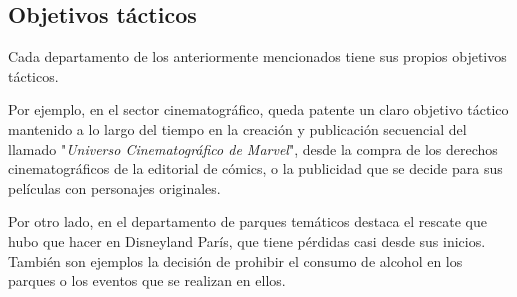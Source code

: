 \subsection{Objetivos tácticos}
Cada departamento de los anteriormente mencionados tiene sus propios objetivos tácticos.

Por ejemplo, en el sector cinematográfico, queda patente un claro objetivo táctico mantenido a lo largo del tiempo en la creación y publicación secuencial del llamado "\textit{Universo Cinematográfico de Marvel}", desde la compra de los derechos cinematográficos de la editorial de cómics, o la publicidad que se decide para sus películas con personajes originales.

Por otro lado, en el departamento de parques temáticos destaca el rescate que hubo que hacer en Disneyland París, que tiene pérdidas casi desde sus inicios. También son ejemplos la decisión de prohibir el consumo de alcohol en los parques o los eventos que se realizan en ellos.